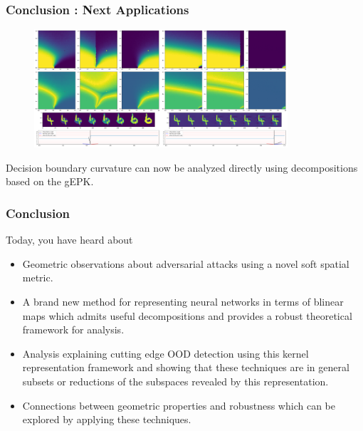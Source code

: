 \begin{frame}
  \frametitle{Conclusion : Next Applications}
\begin{figure}[ht!]
    \centering
    \includegraphics[width=0.42\textwidth]{c5_figures/stab-mnist-C32-50-50-10-0.001-eval-1e-06-none-4-6-db_interp-stability-50.png}\includegraphics[width=0.42\textwidth]{c5_figures/stab-mnist-C32-50-50-10-0.001-eval-1e-06-pgd-4-6-db_interp-stability-50.png}

\end{figure}

Decision boundary curvature can now be analyzed directly using
decompositions based on the gEPK. 
\end{frame}

\begin{frame}
  \frametitle{Conclusion}
  Today, you have heard about
  \begin{itemize}
  \item Geometric observations about adversarial attacks using a novel
    soft spatial metric.
  \item A brand new method for representing neural networks in terms
    of blinear maps which admits useful decompositions and provides a
    robust theoretical framework for analysis.
    \item Analysis explaining cutting edge OOD detection using this
      kernel representation framework and showing that these
      techniques are in general subsets or reductions of the subspaces
      revealed by this representation.
      \item Connections between geometric properties and robustness
        which can be explored by applying these techniques. 
\end{itemize}
\end{frame}

